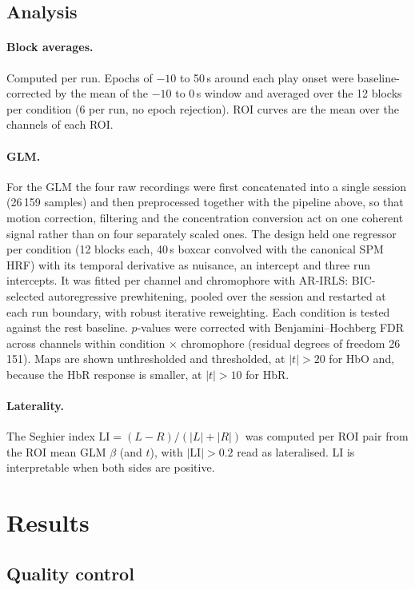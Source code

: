 \documentclass[11pt,a4paper]{article}
\begin{document}
\subsection{Analysis}
\paragraph{Block averages.} Computed per run. Epochs of $-10$ to 50\,s around
each play onset were baseline-corrected by the mean of the $-10$ to 0\,s window
and averaged over the 12 blocks per condition (6 per run, no epoch rejection).
ROI curves are the mean over the channels of each ROI.

\paragraph{GLM.} For the GLM the four raw recordings were first concatenated
into a single session (26\,159 samples) and then preprocessed together with the
pipeline above, so that motion correction, filtering and the concentration
conversion act on one coherent signal rather than on four separately scaled
ones. The design held one regressor per condition (12 blocks each, 40\,s boxcar
convolved with the canonical SPM HRF) with its temporal derivative as
nuisance, an intercept and three run intercepts. It was fitted per channel and
chromophore with AR-IRLS: BIC-selected autoregressive prewhitening, pooled over
the session and restarted at each run boundary, with robust iterative
reweighting. Each condition is tested against the rest baseline.
$p$-values were corrected with Benjamini--Hochberg FDR across channels within
condition $\times$ chromophore (residual degrees of freedom 26\,151). Maps are
shown unthresholded and thresholded, at $|t|>20$ for HbO and, because the HbR
response is smaller, at $|t|>10$ for HbR.

\paragraph{Laterality.} The Seghier index $\mathrm{LI} = (L-R)/(|L|+|R|)$ was
computed per ROI pair from the ROI mean GLM $\beta$ (and $t$), with
$|\mathrm{LI}| > 0.2$ read as lateralised. LI is interpretable when both sides
are positive.

\section{Results}

\subsection{Quality control}
\begin{table}[htbp]
\centering\small

\caption{Per-run QC census. GVTD: global variance of the temporal derivative.}
\label{tab:qc}
\end{table}
\end{document}
